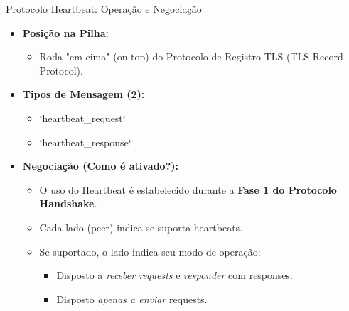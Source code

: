 \begin{frame}{Protocolo Heartbeat: Operação e Negociação}
    \begin{itemize}
        \item \textbf{Posição na Pilha:}
              \begin{itemize}
                  \item Roda "em cima" (on top) do Protocolo de Registro TLS (TLS Record Protocol).
              \end{itemize}

        \item \textbf{Tipos de Mensagem (2):}
              \begin{itemize}
                  \item `heartbeat\_request`
                  \item `heartbeat\_response`
              \end{itemize}

        \item \textbf{Negociação (Como é ativado?):}
              \begin{itemize}
                  \item O uso do Heartbeat é estabelecido durante a \textbf{Fase 1 do Protocolo Handshake}.
                  \item Cada lado (peer) indica se suporta heartbeats.
                  \item Se suportado, o lado indica seu modo de operação:
                        \begin{itemize}
                            \item [Modo 1] Disposto a \textit{receber requests} e \textit{responder} com responses.
                            \item [Modo 2] Disposto \textit{apenas a enviar} requests.
                        \end{itemize}
              \end{itemize}
    \end{itemize}
\end{frame}

